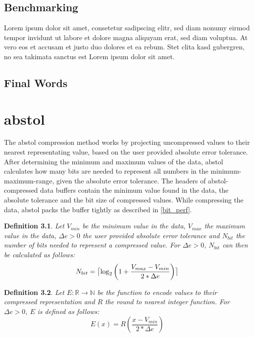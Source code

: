 \documentclass[
	12pt,
	a4paper,
	BCOR10mm,
	DIV14,
	headsepline,
]{scrreprt}
\newtheorem{definition}{Definition}
\DeclarePairedDelimiter{\ceil}{\lceil}{\rceil}
\begin{document}
\section{Benchmarking}
Lorem ipsum dolor sit amet, consetetur sadipscing elitr, sed diam nonumy eirmod tempor invidunt ut labore et dolore magna aliquyam erat, sed diam voluptua.
At vero eos et accusam et justo duo dolores et ea rebum.
Stet clita kasd gubergren, no sea takimata sanctus est Lorem ipsum dolor sit amet.

\section{Final Words}




\appendix
\appendixpage

\chapter{abstol}
\label{abstol}

\bigskip

The abstol compression method works by projecting uncompressed values to their
nearest representating value, based on the user provided absolute error
tolerance. After determining the minimum and maximum values of the data, abstol
calculates how many bits are needed to represent all numbers in the
minimum-maximum-range, given the absolute error tolerance. The headers of
abstol-compressed data buffers contain the minimum value found in the data, the
absolute tolerance and the bit size of compressed values. While compressing the
data, abstol packs the buffer tightly as described in \cref{bit_perf}.

\bigskip

\begin{definition} \label{D:abstol_nbits}
	Let $V_{min}$ be the minimum value in the data, $V_{max}$ the maximum value
	in the data, $\Delta{e} > 0$ the user provided absolute error tolerance and
	$N_{bit}$ the number of bits needed to represent a compressed value. For
	$\Delta{e}>0$, $N_{bit}$ can then be calculated as follows:
	\[
		N_{bit} =
			\ceil[\big]{
				\log_2{
					\left(
						1 + \frac{V_{max} - V_{min}}{2 * \Delta{e}}
					\right)
				}
			}
	\]
\end{definition}

\bigskip

\begin{definition} \label{D:abstol_enc}
	Let $E:\mathbb{R}\rightarrow\mathbb{N}$ be the function to encode values to
	their compressed representation and $R$ the round to nearest integer
	function. For $\Delta{e}>0$, $E$ is defined as follows:
	\[
		E\left(x\right) =
			R
				\left(
					\frac{x - V_{min}}{2 * \Delta{e}}
				\right)
	\]
\end{definition}
\end{document}
